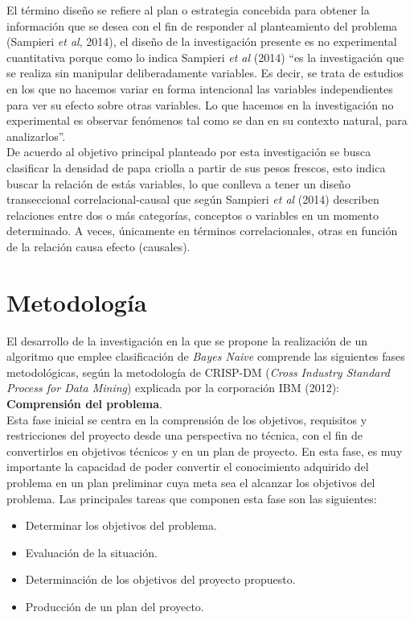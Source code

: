 El término diseño se refiere al plan o estrategia concebida para obtener la información que se desea con el fin de responder al
planteamiento del problema (Sampieri \textit{et al}, 2014), el diseño de la investigación presente es no experimental cuantitativa porque como lo indica Sampieri \textit{et al} (2014) “es la investigación que se realiza sin manipular deliberadamente variables. Es decir, se trata de estudios en los que no hacemos variar en forma intencional las variables independientes para ver su efecto sobre otras variables. Lo que hacemos en la investigación no experimental es observar fenómenos tal como se dan en su contexto natural, para analizarlos”.\\

De acuerdo al objetivo principal planteado por esta investigación se busca clasificar la densidad de papa criolla a partir de sus pesos frescos, esto indica buscar la relación de estás variables, lo que conlleva a tener un diseño transeccional correlacional-causal que según Sampieri \textit{et al} (2014) describen relaciones entre dos o más categorías, conceptos o variables en un momento determinado. A veces, únicamente en términos correlacionales, otras en función de la relación causa efecto (causales).


\section{Metodolog\'ia}

El desarrollo de la investigación en la que se propone la realización de un algoritmo que emplee clasificación de \textit{Bayes Naive} comprende las siguientes fases metodológicas, según la metodología de CRISP-DM (\emph{Cross Industry Standard Process for Data Mining}) explicada por la corporación IBM (2012):\\

\noindent
\textbf{Comprensión del problema}.\\

	Esta fase inicial se centra en la comprensión de los objetivos, requisitos y restricciones del proyecto desde una perspectiva no técnica, con el fin de convertirlos en objetivos técnicos y en un plan de proyecto. En esta fase, es muy importante la capacidad de poder convertir el conocimiento adquirido del problema en un plan preliminar cuya meta sea el alcanzar los objetivos del problema. Las principales tareas que componen esta fase son las siguientes:\\

\begin{itemize}
\item	Determinar los objetivos del problema.
\item Evaluación de la situación.
\item	Determinación de los objetivos del proyecto propuesto.
\item	Producción de un plan del proyecto.\\
\end{itemize}


